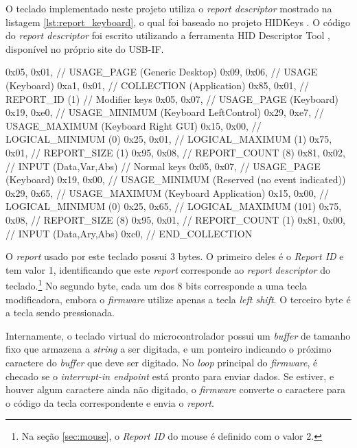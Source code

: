 \documentclass[brazil,pagestart=firstchapter]{abnt}
\begin{document}
O teclado implementado neste projeto utiliza o \textit{report descriptor}
mostrado na listagem \ref{lst:report_keyboard}, o qual foi baseado no
projeto HIDKeys \cite{HIDKeys}. O código do \textit{report descriptor} foi
escrito utilizando a ferramenta HID Descriptor Tool \cite{hiddt}, disponível
no próprio site do \ac{USB-IF}.

\begin{ccode}[numbers=none, float=h, label={lst:report_keyboard},
	caption={\textit{Report descriptor} do teclado USB}
]
	0x05, 0x01,        // USAGE_PAGE (Generic Desktop)
	0x09, 0x06,        // USAGE (Keyboard)
	0xa1, 0x01,        // COLLECTION (Application)
	0x85, 0x01,	       //   REPORT_ID (1)
	// Modifier keys
	0x05, 0x07,        //   USAGE_PAGE (Keyboard)
	0x19, 0xe0,        //   USAGE_MINIMUM (Keyboard LeftControl)
	0x29, 0xe7,        //   USAGE_MAXIMUM (Keyboard Right GUI)
	0x15, 0x00,        //   LOGICAL_MINIMUM (0)
	0x25, 0x01,        //   LOGICAL_MAXIMUM (1)
	0x75, 0x01,        //   REPORT_SIZE (1)
	0x95, 0x08,        //   REPORT_COUNT (8)
	0x81, 0x02,        //   INPUT (Data,Var,Abs)
	// Normal keys
	0x05, 0x07,        //   USAGE_PAGE (Keyboard)
	0x19, 0x00,        //   USAGE_MINIMUM (Reserved (no event indicated))
	0x29, 0x65,        //   USAGE_MAXIMUM (Keyboard Application)
	0x15, 0x00,        //   LOGICAL_MINIMUM (0)
	0x25, 0x65,        //   LOGICAL_MAXIMUM (101)
	0x75, 0x08,        //   REPORT_SIZE (8)
	0x95, 0x01,        //   REPORT_COUNT (1)
	0x81, 0x00,        //   INPUT (Data,Ary,Abs)
	0xc0,              // END_COLLECTION
\end{ccode}

O \textit{report} usado por este teclado possui 3 bytes. O primeiro deles é
o \textit{Report ID} e tem valor 1, identificando que este \textit{report}
corresponde ao \textit{report descriptor} do teclado.\footnote{
	Na seção \ref{sec:mouse}, o \textit{Report ID} do mouse é definido com
	o valor 2.
} No segundo byte, cada um dos 8 bits corresponde a uma tecla modificadora,
embora o \textit{firmware} utilize apenas a tecla \textit{left shift}. O
terceiro byte é a tecla sendo pressionada.

Internamente, o teclado virtual do microcontrolador possui um
\textit{buffer} de tamanho fixo que armazena a \textit{string} a ser
digitada, e um ponteiro indicando o próximo caractere do \textit{buffer} que
deve ser digitado. No \textit{loop} principal do \textit{firmware}, é
checado se o \textit{interrupt-in endpoint} está pronto para enviar dados.
Se estiver, e houver algum caractere ainda não digitado, o \textit{firmware}
converte o caractere para o código da tecla correspondente e envia o
\textit{report}.
\end{document}
